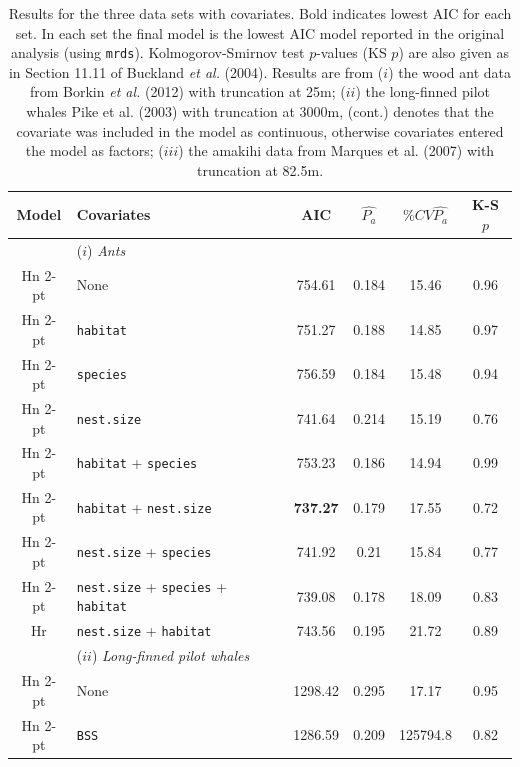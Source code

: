 \documentclass[useAMS,referee]{biom}
\begin{document}
\begin{table}
\caption{Results for the three data sets with covariates. Bold indicates lowest AIC for each set. In each set the final model is the lowest AIC model reported in the original analysis (using \texttt{mrds}). Kolmogorov-Smirnov test $p$-values (KS $p$) are also given as in Section 11.11 of Buckland \textit{et al.} (2004). Results are from ($i$) the wood ant data from Borkin \textit{et al.} (2012) with truncation at 25m; ($ii$) the long-finned pilot whales Pike et al. (2003) with truncation at 3000m, (cont.) denotes that the covariate was included in the model as continuous, otherwise covariates entered the model as factors; ($iii$) the amakihi data from Marques et al. (2007) with truncation at 82.5m.}
\centering
\begin{tabular}{c l c c c c}
\hline \hline
Model & Covariates & AIC & $\hat{P_a}$ & $\% CV \hat{P_a}$ & K-S $p$\\
\hline
 & ($i$) \textit{Ants} & & & & \\
Hn 2-pt  &  None  &  754.61  &  0.184  &  15.46  &  0.96 \\
Hn 2-pt  &   \texttt{habitat} &  751.27  &  0.188  &  14.85  &  0.97 \\
Hn 2-pt  &   \texttt{species} &  756.59  &  0.184  &  15.48  &  0.94 \\
Hn 2-pt  &  \texttt{nest.size} &  741.64  &  0.214  &  15.19  &  0.76 \\
Hn 2-pt  &  \texttt{habitat} + \texttt{species} &  753.23  &  0.186  &  14.94  &  0.99 \\
Hn 2-pt  &  \texttt{habitat} + \texttt{nest.size}  &  \textbf{737.27}  &  0.179  &  17.55  &  0.72 \\
Hn 2-pt  & \texttt{nest.size} + \texttt{species}   &  741.92  &  0.21  &  15.84  &  0.77 \\
Hn 2-pt  &  \texttt{nest.size} + \texttt{species} + \texttt{habitat}  &  739.08  &  0.178  &  18.09  &  0.83 \\
Hr & \texttt{nest.size} + \texttt{habitat} & 743.56 & 0.195  & 21.72 & 0.89\\ %
 & ($ii$) \textit{Long-finned pilot whales} & & & & \\
Hn 2-pt  &  None  &  1298.42  &  0.295  &  17.17  &  0.95 \\
Hn 2-pt  &  \texttt{BSS}  &  1286.59  &  0.209  &  125794.8  &  0.82 \\

\end{tabular}
\end{table}
\end{document}
